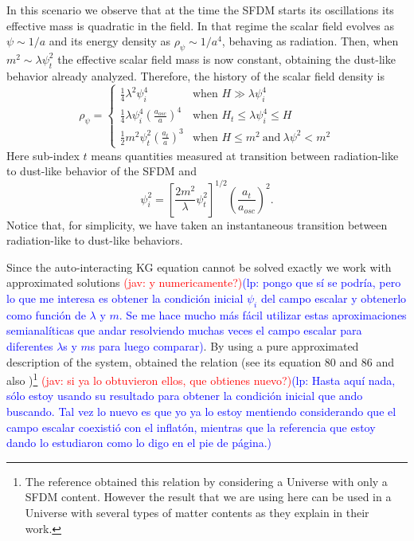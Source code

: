 \documentclass[amssymb,twocolumn,prd,nofootinbib,showpacs]{revtex4-1}
\newcommand{\jav}[1]{\textcolor{red}{(jav: #1)}}
\newcommand{\lp}[1]{\textcolor{blue}{(lp: #1)}}
\begin{document}
\begin{itemize}
In this scenario we observe that at the time the SFDM starts its oscillations its effective mass is quadratic in the field. 
In that regime the scalar field evolves as $\psi\sim 1/a$ and its energy density as $\rho_{\psi}\sim 1/a^4$, 
behaving as radiation. Then, when $m^2 \sim \lambda\psi_t^2$ the effective scalar field mass is now constant, 
obtaining the dust-like behavior already analyzed. 
Therefore, the history of the scalar field density is
%
\begin{equation}\label{rhosfdmlam}
\rho_\psi = \left\lbrace\begin{array}{ll}
\frac{1}{4}\lambda^2\psi_i^4 & \text{when }H\gg \lambda\psi_i^4 \\
\frac{1}{4}\lambda\psi_i^4\left(\frac{a_{osc}}{a}\right)^4 & \text{when }H_t\leq \lambda\psi_i^4\leq H\\
\frac{1}{2}m^2\psi_t^2\left(\frac{a_t}{a}\right)^3 & \text{when } H\leq m^2\ \text{and}\ \lambda\psi^2<m^2
\end{array}\right .
\end{equation}
%
Here sub-index $t$ means quantities measured at transition between radiation-like to dust-like behavior of the SFDM and
\begin{equation}\label{inilamb}
\psi_i^2=\left[\frac{2m^2}{\lambda}\psi_t^2\right]^{1/2}\left(\frac{a_t}{a_{osc}}\right)^2.
\end{equation}
%
Notice that, for simplicity, we have taken an instantaneous transition between radiation-like to dust-like behaviors. 

Since the auto-interacting KG equation cannot be solved exactly we work with approximated 
solutions \jav{y numericamente?}\lp{pongo que s\'i se  podr\'ia,  pero  lo  que  me  interesa  es  obtener  la condici\'on inicial $\psi_i$ del campo escalar y obtenerlo como funci\'on de $\lambda$ y $m$. Se me hace mucho m\'as f\'acil
utilizar estas aproximaciones semianal\'iticas que andar resolviendo muchas veces el campo escalar para diferentes $\lambda$s y $m$s para luego comparar}. By using a pure approximated description of the system,
 \cite{SFphi42} obtained the relation (see its equation 80 and 86 and also \cite{SFphi41})\footnote{The reference \cite{SFphi42} obtained this relation by considering a Universe with only a SFDM content. However the result that we are using here can be used in a Universe with several types of matter contents as they explain in their work.} 
 \jav{si ya lo obtuvieron ellos, que obtienes nuevo?}\lp{Hasta  aqu\'i  nada,  s\'olo  estoy usando su resultado para obtener la condici\'on inicial que ando buscando. Tal vez lo nuevo es que yo ya lo estoy mentiendo considerando que el campo escalar coexisti\'o con el inflat\'on, mientras que la referencia que estoy dando lo estudiaron como lo digo en
el pie de p\'agina.}


\end{itemize}
\end{document}
